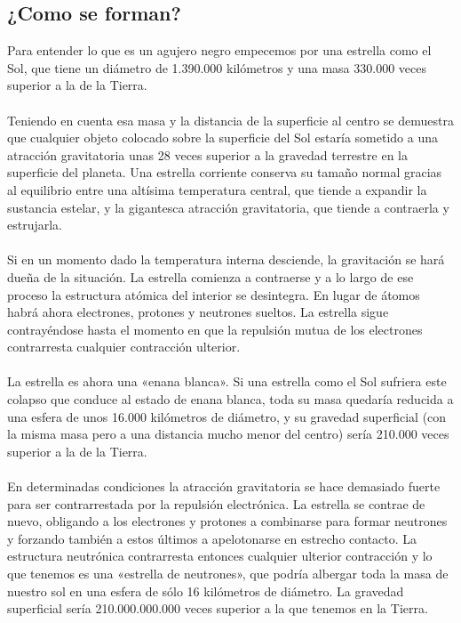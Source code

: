 \documentclass[12pt]{article}
\begin{document}
\subsection{¿Como se forman?}
Para entender lo que es un agujero negro empecemos por una estrella como el Sol, que tiene un diámetro de 1.390.000 kilómetros y una masa 330.000 veces superior a la de la Tierra.\\\\
Teniendo en cuenta esa masa y la distancia de la superficie al centro se demuestra que cualquier objeto colocado sobre la superficie del Sol estaría sometido a una atracción gravitatoria unas 28 veces superior a la gravedad terrestre en la superficie del planeta. Una estrella corriente conserva su tamaño normal gracias al equilibrio entre una altísima temperatura central, que tiende a expandir la sustancia estelar, y la gigantesca atracción gravitatoria, que tiende a contraerla y estrujarla.
\\\\
Si en un momento dado la temperatura interna desciende, la gravitación se hará dueña de la situación. La estrella comienza a contraerse y a lo largo de ese proceso la estructura atómica del interior se desintegra. En lugar de átomos habrá ahora electrones, protones y neutrones sueltos. La estrella sigue contrayéndose hasta el momento en que la repulsión mutua de los electrones contrarresta cualquier contracción ulterior.\\\\
La estrella es ahora una «enana blanca». Si una estrella como el Sol sufriera este colapso que conduce al estado de enana blanca, toda su masa quedaría reducida a una esfera de unos 16.000 kilómetros de diámetro, y su gravedad superficial (con la misma masa pero a una distancia mucho menor del centro) sería 210.000 veces superior a la de la Tierra.\\\\
En determinadas condiciones la atracción gravitatoria se hace demasiado fuerte para ser contrarrestada por la repulsión electrónica. La estrella se contrae de nuevo, obligando a los electrones y protones a combinarse para formar neutrones y forzando también a estos últimos a apelotonarse en estrecho contacto. La estructura neutrónica contrarresta entonces cualquier ulterior contracción y lo que tenemos es una «estrella de neutrones», que podría albergar toda la masa de nuestro sol en una esfera de sólo 16 kilómetros de diámetro. La gravedad superficial sería 210.000.000.000 veces superior a la que tenemos en la Tierra.
\end{document}
